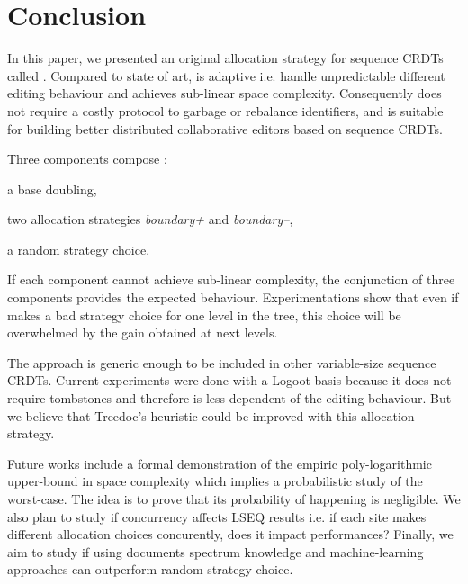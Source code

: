 \section{Conclusion}

In this paper, we presented an original allocation strategy for sequence CRDTs
called \NAME{}. Compared to state of art, \NAME{} is adaptive i.e. handle
unpredictable different editing behaviour and achieves sub-linear space
complexity. Consequently \NAME{} does not require a costly protocol to garbage
or rebalance identifiers, and is suitable for building better distributed
collaborative editors based on sequence CRDTs.

Three components compose \NAME{}:
\begin{inparaenum}[(1)]
  \item a base doubling,
  \item two allocation strategies \emph{boundary+} and \emph{boundary--},
  \item a random strategy choice.
\end{inparaenum}

If each component cannot achieve sub-linear complexity, the conjunction of
three components provides the expected behaviour. Experimentations show that
even if \NAME{} makes a bad strategy choice for one level in the tree, this
choice will be overwhelmed by the gain obtained at next levels.


The \NAME{} approach is generic enough to be included in other variable-size
sequence CRDTs. Current experiments were done with a Logoot basis because it
does not require tombstones and therefore is less dependent of the editing
behaviour. But we believe that Treedoc's heuristic could be improved with this
allocation strategy.

Future works include a formal demonstration of the empiric poly-logarithmic
upper-bound in space complexity which implies a probabilistic study of the
worst-case. The idea is to prove that its probability of happening is
negligible. We also plan to study if concurrency affects LSEQ results i.e. if
each site makes different allocation choices concurently, does it impact
\NAME{} performances? Finally, we aim to study if using documents spectrum
knowledge and machine-learning approaches can outperform random strategy
choice.
